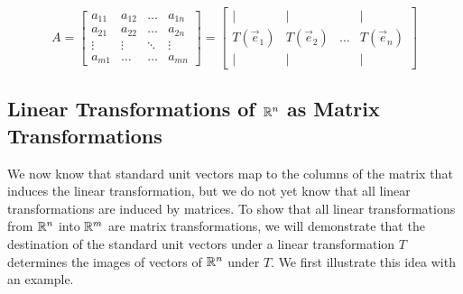 \documentclass{ximera}
\begin{document}
  \begin{equation*} \label{eq:matlintrans}
 A=\begin{bmatrix}
           a_{11} & a_{12}&\dots&a_{1n}\\
           a_{21}&a_{22} &\dots &a_{2n}\\
		\vdots & \vdots&\ddots &\vdots\\
		a_{m1}&\dots &\dots &a_{mn}
         \end{bmatrix}
		 = 
         \begin{bmatrix}
           | & |& &|\\
		T(\vec{e}_1) & T(\vec{e}_2)&\dots &T(\vec{e}_n)\\
		|&| & &|
         \end{bmatrix}
\end{equation*}


\subsection*{Linear Transformations of $\mathbb{R}^n$ as Matrix Transformations}

We now know that standard unit vectors map to the columns of the matrix that induces the linear transformation, but we do not yet know that all linear transformations are induced by matrices.  To show that all linear transformations from $\mathbb{R}^n$ into $\mathbb{R}^m$ are matrix transformations, we will demonstrate that the destination of the standard unit vectors under a linear transformation $T$ determines the images of  vectors of $\mathbb{R}^n$ under $T$. We first illustrate this idea with an example.  
\end{document}
